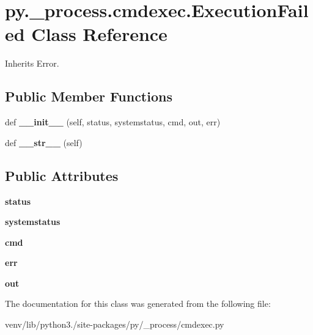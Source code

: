\hypertarget{classpy_1_1__process_1_1cmdexec_1_1_execution_failed}{}\section{py.\+\_\+process.\+cmdexec.\+Execution\+Failed Class Reference}
\label{classpy_1_1__process_1_1cmdexec_1_1_execution_failed}


Inherits Error.

\subsection*{Public Member Functions}
\begin{DoxyCompactItemize}
\item 
\mbox{\label{classpy_1_1__process_1_1cmdexec_1_1_execution_failed_a480dc970ed9f2b04b0c584189dcd9cdb}} 
def {\bfseries \+\_\+\+\_\+init\+\_\+\+\_\+} (self, status, systemstatus, cmd, out, err)
\item 
\mbox{\label{classpy_1_1__process_1_1cmdexec_1_1_execution_failed_a5c68f1fa5a1d5e84a76ec25593d4a63d}} 
def {\bfseries \+\_\+\+\_\+str\+\_\+\+\_\+} (self)
\end{DoxyCompactItemize}
\subsection*{Public Attributes}
\begin{DoxyCompactItemize}
\item 
\mbox{\label{classpy_1_1__process_1_1cmdexec_1_1_execution_failed_ad9c9a883636bc5c8a43401bdd1a5d0a5}} 
{\bfseries status}
\item 
\mbox{\label{classpy_1_1__process_1_1cmdexec_1_1_execution_failed_a331b83ad70fff91c451355f689ab7e07}} 
{\bfseries systemstatus}
\item 
\mbox{\label{classpy_1_1__process_1_1cmdexec_1_1_execution_failed_a790489086b800f2490d7e51234855800}} 
{\bfseries cmd}
\item 
\mbox{\label{classpy_1_1__process_1_1cmdexec_1_1_execution_failed_add2298e5e8590bba58e8b2f952170a91}} 
{\bfseries err}
\item 
\mbox{\label{classpy_1_1__process_1_1cmdexec_1_1_execution_failed_a7aea8b1373f94004965413d58185ee9a}} 
{\bfseries out}
\end{DoxyCompactItemize}


The documentation for this class was generated from the following file\+:\begin{DoxyCompactItemize}
\item 
venv/lib/python3./site-\/packages/py/\+\_\+process/cmdexec.\+py\end{DoxyCompactItemize}
